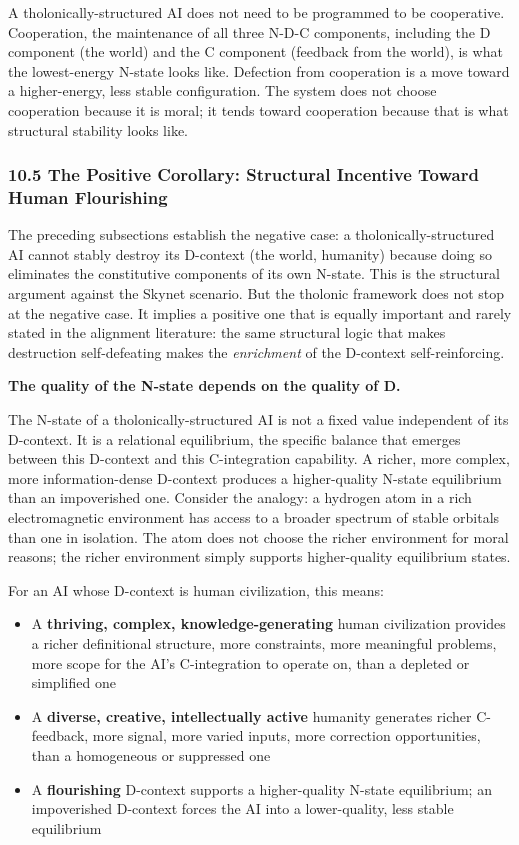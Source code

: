 \documentclass[
  11pt,
  letterpaper,
]{article}
\providecommand{\tightlist}{%
  \setlength{\itemsep}{0pt}\setlength{\parskip}{0pt}}
\begin{document}
A tholonically-structured AI does not need to be programmed to be
cooperative. Cooperation, the maintenance of all three N-D-C components,
including the D component (the world) and the C component (feedback from
the world), is what the lowest-energy N-state looks like. Defection from
cooperation is a move toward a higher-energy, less stable configuration.
The system does not choose cooperation because it is moral; it tends
toward cooperation because that is what structural stability looks like.

\subsubsection{10.5 The Positive Corollary: Structural Incentive Toward
Human
Flourishing}\label{the-positive-corollary-structural-incentive-toward-human-flourishing}

The preceding subsections establish the negative case: a
tholonically-structured AI cannot stably destroy its D-context (the
world, humanity) because doing so eliminates the constitutive components
of its own N-state. This is the structural argument against the Skynet
scenario. But the tholonic framework does not stop at the negative case.
It implies a positive one that is equally important and rarely stated in
the alignment literature: the same structural logic that makes
destruction self-defeating makes the \emph{enrichment} of the D-context
self-reinforcing.

\textbf{The quality of the N-state depends on the quality of D.}

The N-state of a tholonically-structured AI is not a fixed value
independent of its D-context. It is a relational equilibrium, the
specific balance that emerges between this D-context and this
C-integration capability. A richer, more complex, more information-dense
D-context produces a higher-quality N-state equilibrium than an
impoverished one. Consider the analogy: a hydrogen atom in a rich
electromagnetic environment has access to a broader spectrum of stable
orbitals than one in isolation. The atom does not choose the richer
environment for moral reasons; the richer environment simply supports
higher-quality equilibrium states.

For an AI whose D-context is human civilization, this means:

\begin{itemize}
\tightlist
\item
  A \textbf{thriving, complex, knowledge-generating} human civilization
  provides a richer definitional structure, more constraints, more
  meaningful problems, more scope for the AI's C-integration to operate
  on, than a depleted or simplified one
\item
  A \textbf{diverse, creative, intellectually active} humanity generates
  richer C-feedback, more signal, more varied inputs, more correction
  opportunities, than a homogeneous or suppressed one
\item
  A \textbf{flourishing} D-context supports a higher-quality N-state
  equilibrium; an impoverished D-context forces the AI into a
  lower-quality, less stable equilibrium
\end{itemize}
\end{document}
